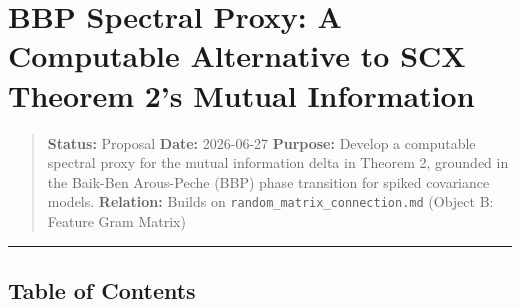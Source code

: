 \documentclass[
  12pt,
]{article}
\author{SCX}
\date{2026}
\begin{document}
\section{BBP Spectral Proxy: A Computable Alternative to SCX Theorem 2's
Mutual
Information}\label{bbp-spectral-proxy-a-computable-alternative-to-scx-theorem-2s-mutual-information}

\begin{quote}
\textbf{Status:} Proposal \textbar{} \textbf{Date:} 2026-06-27
\textbf{Purpose:} Develop a computable spectral proxy for the mutual
information delta in Theorem 2, grounded in the Baik-Ben Arous-Peche
(BBP) phase transition for spiked covariance models. \textbf{Relation:}
Builds on \texttt{random\_matrix\_connection.md} (Object B: Feature Gram
Matrix)
\end{quote}

\begin{center}\rule{0.5\linewidth}{0.5pt}\end{center}

\subsection{Table of Contents}\label{table-of-contents}
\end{document}
